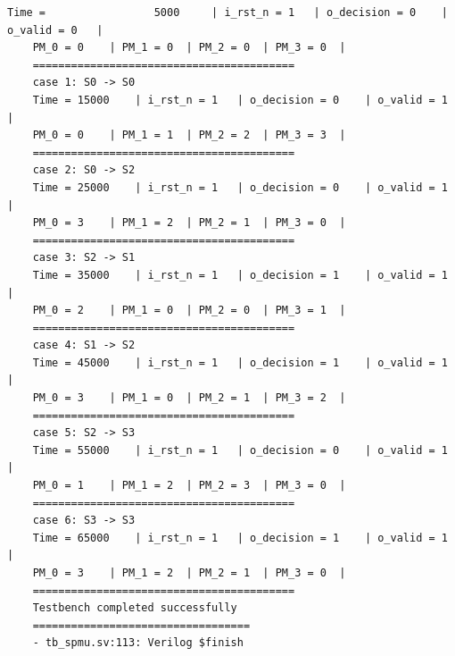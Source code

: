 \begin{lstlisting}[style=StyleResult, language=Result]
	Time =                 5000 	| i_rst_n = 1 	| o_decision = 0 	| o_valid = 0 	|
	PM_0 = 0 	| PM_1 = 0 	| PM_2 = 0 	| PM_3 = 0 	| 
	=========================================
	case 1: S0 -> S0
	Time = 15000 	| i_rst_n = 1 	| o_decision = 0 	| o_valid = 1 	|
	PM_0 = 0 	| PM_1 = 1 	| PM_2 = 2 	| PM_3 = 3 	| 
	=========================================
	case 2: S0 -> S2
	Time = 25000 	| i_rst_n = 1 	| o_decision = 0 	| o_valid = 1 	|
	PM_0 = 3 	| PM_1 = 2 	| PM_2 = 1 	| PM_3 = 0 	| 
	=========================================
	case 3: S2 -> S1
	Time = 35000 	| i_rst_n = 1 	| o_decision = 1 	| o_valid = 1 	|
	PM_0 = 2 	| PM_1 = 0 	| PM_2 = 0 	| PM_3 = 1 	| 
	=========================================
	case 4: S1 -> S2
	Time = 45000 	| i_rst_n = 1 	| o_decision = 1 	| o_valid = 1 	|
	PM_0 = 3 	| PM_1 = 0 	| PM_2 = 1 	| PM_3 = 2 	| 
	=========================================
	case 5: S2 -> S3
	Time = 55000 	| i_rst_n = 1 	| o_decision = 0 	| o_valid = 1 	|
	PM_0 = 1 	| PM_1 = 2 	| PM_2 = 3 	| PM_3 = 0 	| 
	=========================================
	case 6: S3 -> S3
	Time = 65000 	| i_rst_n = 1 	| o_decision = 1 	| o_valid = 1 	|
	PM_0 = 3 	| PM_1 = 2 	| PM_2 = 1 	| PM_3 = 0 	| 
	=========================================
	Testbench completed successfully
	==================================
	- tb_spmu.sv:113: Verilog $finish
\end{lstlisting}